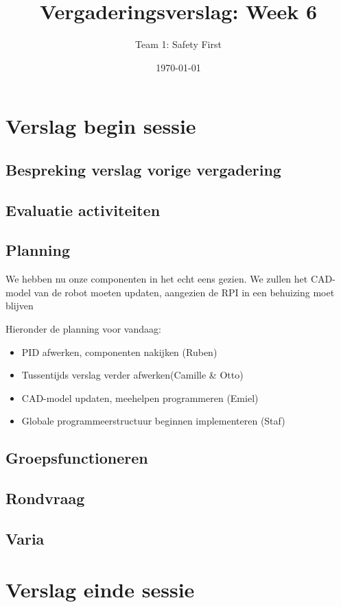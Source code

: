 \documentclass[a4paper,kulak]{kulakarticle} %
\date{\today}
\title{Vergaderingsverslag: Week 6}
\author{Team 1: Safety First}
\begin{document}
\maketitle

\section{Verslag begin sessie}
\subsection{Bespreking verslag vorige vergadering}
\subsection{Evaluatie activiteiten}
\subsection{Planning}
We hebben nu onze componenten in het echt eens gezien. We zullen het CAD-model van de robot moeten updaten, aangezien de RPI in een behuizing moet blijven

Hieronder de planning voor vandaag:
\begin{itemize}
	\item PID afwerken, componenten nakijken (Ruben)
	\item Tussentijds verslag verder afwerken(Camille \& Otto)
	\item CAD-model updaten, meehelpen programmeren (Emiel)
	\item Globale programmeerstructuur beginnen implementeren (Staf)
\end{itemize}

\subsection{Groepsfunctioneren}
\subsection{Rondvraag}
\subsection{Varia}




\section{Verslag einde sessie}
\end{document}
